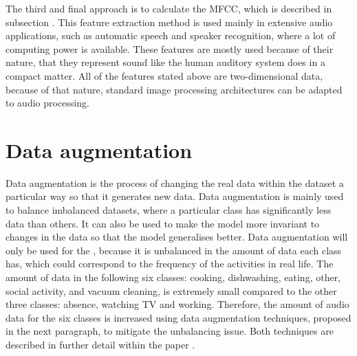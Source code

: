\newline
\newline
The third and final approach is to calculate the \gls{MFCC}, which is described in subsection . This feature extraction method is used mainly in extensive audio applications, such as automatic speech and speaker recognition, where a lot of computing power is available. These features are mostly used because of their nature, that they represent sound like the human auditory system does in a compact matter.
\newline
\newline
All of the features stated above are two-dimensional data, because of that nature, standard image processing architectures can be adapted to audio processing.

\section{Data augmentation}
\label{sec:Data-Augmentation}
Data augmentation is the process of changing the real data within the dataset a particular way so that it generates new data. Data augmentation is mainly used to balance imbalanced datasets, where a particular class has significantly less data than others. It can also be used to make the model more invariant to changes in the data so that the model generalises better.
\newline
\newline
Data augmentation will only be used for the , because it is unbalanced in the amount of data each class has, which could correspond to the frequency of the activities in real life. The amount of data in the following six classes: cooking, dishwashing, eating, other, social activity, and vacuum cleaning, is extremely small compared to the other three classes: absence, watching TV and working. Therefore, the amount of audio data for the six classes is increased using data augmentation techniques, proposed in the next paragraph, to mitigate the unbalancing issue. Both techniques are described in further detail within the paper \cite{inoue_domestic_2018}.

